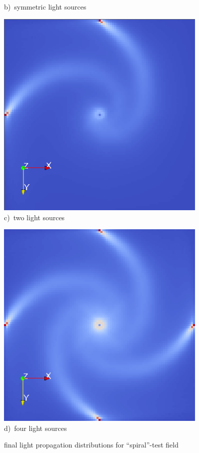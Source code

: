 \documentclass{scrartcl}
\begin{document}
\begin{figure}[!t]
\begin{minipage}{0.4\textwidth}
    \label{b)}
	b)~symmetric light sources
  \end{minipage}
  \begin{minipage}{0.4\textwidth}
    \centering
    \includegraphics[width=0.9\textwidth]{img/spiral-temp2.png}
    \label{a)}
	c)~two light sources
  \end{minipage}
  \begin{minipage}{0.4\textwidth}
    \centering
    \includegraphics[width=0.9\textwidth]{img/spiral_full.png}
    \label{b)}
	d)~four light sources
  \end{minipage}
\caption{final light propagation distributions for ``spiral''-test field}
\label{spiral-tests}
\end{figure}
\end{document}
